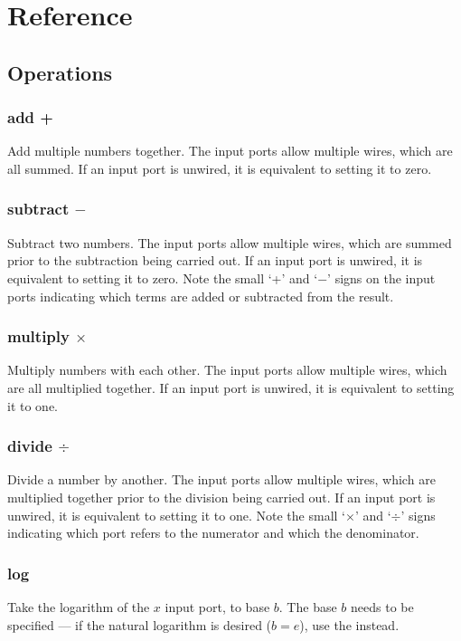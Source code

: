 \chapter{Reference}

\section{Operations}\label{operations}


\subsection{add +}\label{Operation:add} Add multiple numbers together. The input
  ports allow multiple wires, which are all summed. If an input port
  is unwired, it is equivalent to setting it to zero.

\subsection{subtract $-$}\label{Operation:subtract} Subtract two numbers. The input
  ports allow multiple wires, which are summed prior to the
  subtraction being carried out. If an input port is unwired, it is
  equivalent to setting it to zero. Note the small `+' and `$-$' signs
  on the input ports indicating which terms are added or subtracted from
  the result.

\subsection{multiply $\times$}\label{Operation:multiply} Multiply numbers with each
  other. The input ports allow multiple wires, which are all
  multiplied together. If an input port is unwired, it is equivalent
  to setting it to one.

\subsection{divide $\div$}\label{Operation:divide} Divide a number by another. The
  input ports allow multiple wires, which are multiplied together
  prior to the division being carried out. If an input port is
  unwired, it is equivalent to setting it to one. Note the small
  `$\times$' and `$\div$' signs indicating which port refers to the
  numerator and which the denominator.

\subsection{log}\label{Operation:log} Take the logarithm of the $x$ input port, to
base $b$. The base $b$ needs to be specified --- if the natural
logarithm is desired ($b=e$), use the  instead.

